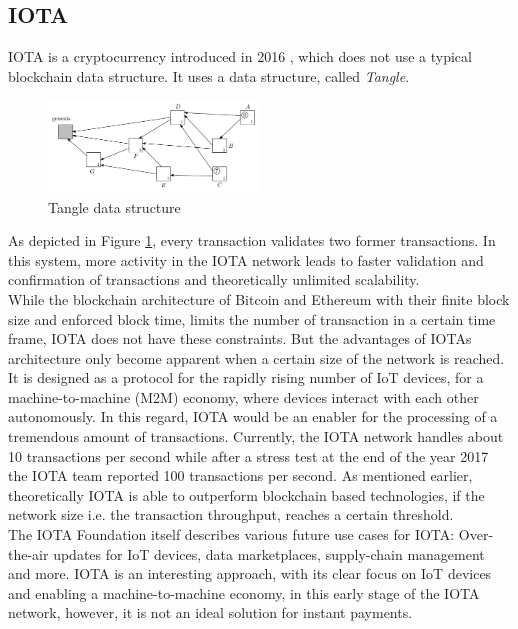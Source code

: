 \subsection{IOTA}
IOTA is a cryptocurrency introduced in 2016 \cite{popovtangle:online}, which does not use a typical blockchain data structure. It uses a data structure, called \textit{Tangle}.
\begin{figure}[ht]
\centering
  \includegraphics[width=0.5\textwidth]{assets/tangle.png}
\caption{Tangle data structure}
\label{fig:tangle}
\end{figure}
As depicted in Figure \ref{fig:tangle}, every transaction validates two former transactions. In this system, more activity in the IOTA network leads to faster validation and confirmation of transactions and theoretically unlimited scalability.
\\
While the  blockchain architecture of Bitcoin and Ethereum with their finite block size and enforced block time, limits the number of transaction in a certain time frame, IOTA does not have these constraints. But the advantages of IOTAs architecture only become apparent when a certain size of the network is reached. It is designed as a protocol for the rapidly rising number of IoT devices, for a machine-to-machine (M2M) economy, where devices interact with each other autonomously. In this regard, IOTA would be an enabler for the processing of a tremendous amount of transactions. Currently, the IOTA network handles about 10 transactions per second while after a stress test at the end of the year 2017 the IOTA team reported 100 transactions per second. As mentioned earlier, theoretically IOTA is able to outperform blockchain based technologies, if the network size i.e. the transaction throughput, reaches a certain threshold. \\

The IOTA Foundation itself describes various future use cases for IOTA: Over-the-air updates for IoT devices, data marketplaces, supply-chain management and more.
IOTA is an interesting approach, with its clear focus on IoT devices and enabling a machine-to-machine economy, in this early stage of the IOTA network, however, it is not an ideal solution for instant payments.\\

